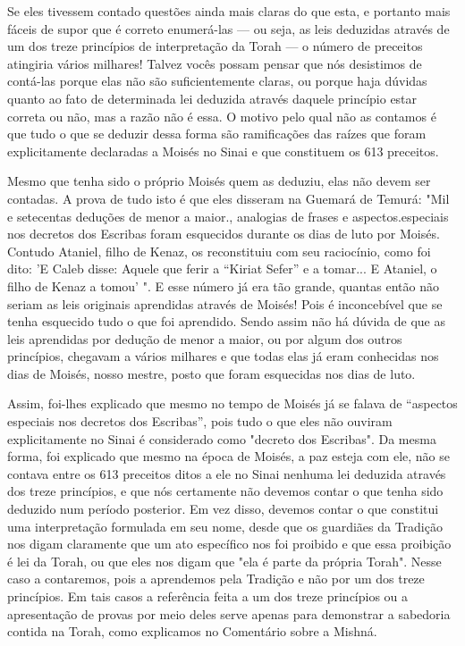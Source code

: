 Se eles tivessem contado questões ainda mais claras do que esta, e
portanto mais fáceis de supor que é correto enumerá-las --- ou seja, as
leis de­duzidas através de um dos treze princípios de interpretação da
Torah --- o nú­mero de preceitos atingiria vários milhares! Talvez vocês
possam pensar que nós desistimos de contá-las porque elas não são
suficientemente claras, ou por­que haja dúvidas quanto ao fato de
determinada lei deduzida através daquele princípio estar correta ou não,
mas a razão não é essa. O motivo pelo qual não as contamos é que tudo o
que se deduzir dessa forma são ramificações das raí­zes que foram
explicitamente declaradas a Moisés no Sinai e que constituem os 613
preceitos.

Mesmo que tenha sido o próprio Moisés quem as deduziu, elas não devem
ser contadas. A prova de tudo isto é que eles disseram na Guemará de
Temurá: "Mil e setecentas deduções de menor a maior., analogias de
frases e aspectos.especiais nos decretos dos Escribas foram esquecidos
durante os dias de luto por Moisés. Contudo Ataniel, filho de Kenaz, os
reconstituiu com seu raciocínio, como foi dito: 'E Caleb disse: Aquele
que ferir a ``Kiriat Sefer'' e a tomar... E Ataniel, o filho de Kenaz a
tomou' ". E esse número já era tão gran­de, quantas então não seriam as
leis originais aprendidas através de Moisés! Pois é inconcebível que se
tenha esquecido tudo o que foi aprendido. Sendo assim não há dúvida de
que as leis aprendidas por dedução de menor a maior, ou por algum dos
outros princípios, chegavam a vários milhares e que todas elas já eram
conhecidas nos dias de Moisés, nosso mestre, posto que foram esqueci­das
nos dias de luto.

Assim, foi-lhes explicado que mesmo no tempo de Moisés já se fala­va de
``aspectos especiais nos decretos dos Escribas'', pois tudo o que eles não
ouviram explicitamente no Sinai é considerado como "decreto dos
Escribas". Da mesma forma, foi explicado que mesmo na época de Moisés, a
paz esteja com ele, não se contava entre os 613 preceitos ditos a ele no
Sinai nenhuma lei deduzida através dos treze princípios, e que nós
certamente não devemos contar o que tenha sido deduzido num período
posterior. Em vez disso, deve­mos contar o que constitui uma
interpretação formulada em seu nome, desde que os guardiães da Tradição
nos digam claramente que um ato específico nos foi proibido e que essa
proibição é lei da Torah, ou que eles nos digam que "ela é parte da
própria Torah". Nesse caso a contaremos, pois a aprendemos pela Tradição
e não por um dos treze princípios. Em tais casos a referência feita a um
dos treze princípios ou a apresentação de provas por meio deles serve
apenas para demonstrar a sabedoria contida na Torah, como explicamos no
Co­mentário sobre a Mishná.

